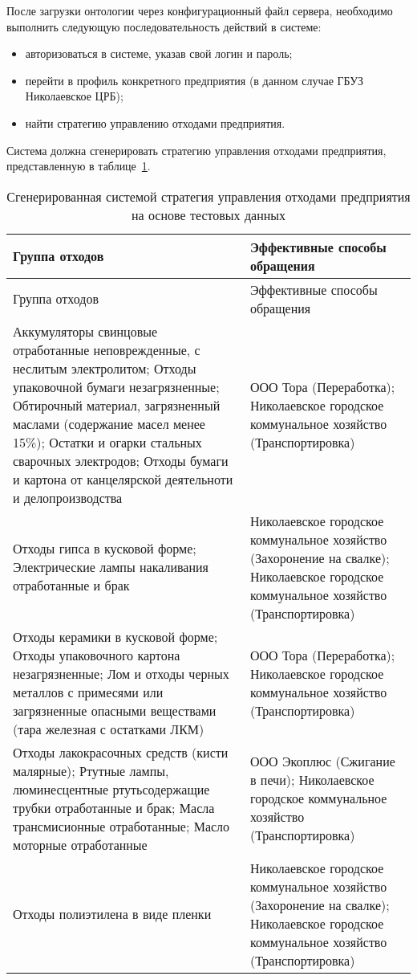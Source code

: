 \documentclass[a4paper]{G2-105}
\begin{document}
После загрузки онтологии через конфигурационный файл сервера, необходимо выполнить следующую последовательность действий в системе:
\begin{itemize}
\item авторизоваться в системе, указав свой логин и пароль;
\item перейти в профиль конкретного предприятия (в данном случае ГБУЗ Николаевское ЦРБ);
\item найти стратегию управлению отходами предприятия.
\end{itemize}

Система должна сгенерировать стратегию управления отходами предприятия, представленную в таблице~\ref{tab:test_results}.

\begin{longtable}[l]{|p{7.5cm}|p{7.5cm}|}
\caption{Сгенерированная системой стратегия управления отходами предприятия на основе тестовых данных}
\label{tab:test_results}\tabularnewline
\hline
Группа отходов & Эффективные способы обращения \tabularnewline
\endfirsthead
\hline
Группа отходов & Эффективные способы обращения \tabularnewline
\endhead
\hline
Аккумуляторы свинцовые отработанные неповрежденные, с неслитым электролитом;
Отходы упаковочной бумаги незагрязненные; Обтирочный материал, загрязненный маслами (содержание масел менее 15\%); Остатки и огарки стальных сварочных электродов; Отходы бумаги и картона от канцелярской деятельноти и делопроизводства & ООО Тора (Переработка); Николаевское городское коммунальное хозяйство (Транспортировка) \tabularnewline
\hline
Отходы гипса в кусковой форме; Электрические лампы накаливания отработанные и брак & Николаевское городское коммунальное хозяйство (Захоронение на свалке); Николаевское городское коммунальное хозяйство (Транспортировка) \tabularnewline
\hline
Отходы керамики в кусковой форме; Отходы упаковочного картона незагрязненные; Лом и отходы черных металлов с примесями или загрязненные опасными веществами (тара железная с остатками ЛКМ) & ООО Тора (Переработка); Николаевское городское коммунальное хозяйство (Транспортировка) \tabularnewline
\hline
Отходы лакокрасочных средств (кисти малярные); Ртутные лампы, люминесцентные ртутьсодержащие трубки отработанные и брак; Масла трансмисионные отработанные; Масло моторные отработанные & ООО Экоплюс (Сжигание в печи); Николаевское городское коммунальное хозяйство (Транспортировка) \tabularnewline
\hline
Отходы полиэтилена в виде пленки & Николаевское городское коммунальное хозяйство (Захоронение на свалке); Николаевское городское коммунальное хозяйство (Транспортировка) \tabularnewline

\end{longtable}
\end{document}
